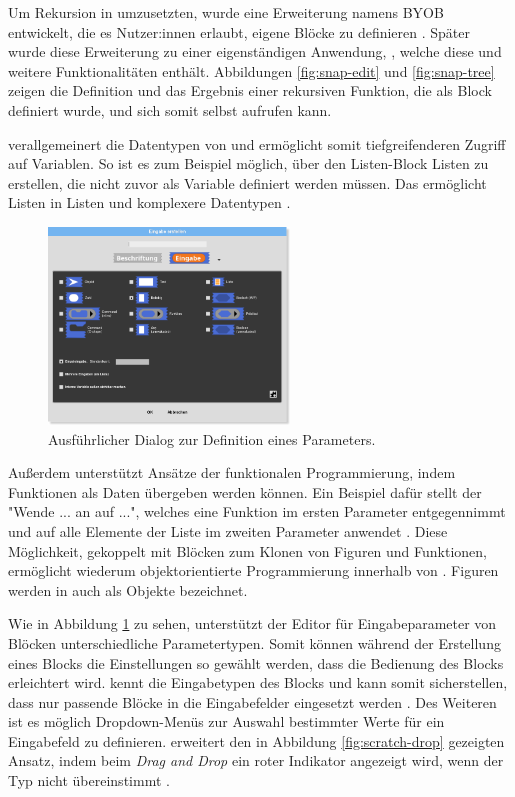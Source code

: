 Um Rekursion in \Scratch{} umzusetzten, wurde eine Erweiterung namens \ac{BYOB} entwickelt, die es Nutzer:innen erlaubt, eigene Blöcke zu definieren \parencite{harveyBringingNo2010}. Später wurde diese Erweiterung zu einer eigenständigen Anwendung, \Snap{}, welche diese und weitere Funktionalitäten enthält. Abbildungen \ref{fig:snap-edit} und \ref{fig:snap-tree} zeigen die Definition und das Ergebnis einer rekursiven Funktion, die als Block definiert wurde, und sich somit selbst aufrufen kann.

\Snap{} verallgemeinert die Datentypen von \Scratch{} und ermöglicht somit tiefgreifenderen Zugriff auf Variablen. So ist es zum Beispiel möglich, über den Listen-Block Listen zu erstellen, die nicht zuvor als Variable definiert werden müssen. Das ermöglicht Listen in Listen und komplexere Datentypen \parencite{harveySnapReference2020}.

\begin{figure}
  \centering
  \includegraphics[width=0.57\textwidth]{assets/snap-input-types.png}
  \caption{Ausführlicher Dialog zur Definition eines Parameters.}
  \label{fig:snap-input-types}
\end{figure}

Außerdem unterstützt \Snap{} Ansätze der funktionalen Programmierung, indem Funktionen als Daten übergeben werden können. Ein Beispiel dafür stellt der "Wende ... an auf ...", welches eine Funktion im ersten Parameter entgegennimmt und auf alle Elemente der Liste im zweiten Parameter anwendet \parencite{harveySnapReference2020}. Diese Möglichkeit, gekoppelt mit Blöcken zum Klonen von Figuren und Funktionen, ermöglicht wiederum objektorientierte Programmierung innerhalb von \Snap{} \parencite{harveySnapReference2020}. Figuren werden in \Snap{} auch als Objekte bezeichnet.

Wie in Abbildung \ref{fig:snap-input-types} zu sehen, unterstützt der Editor für Eingabeparameter von Blöcken unterschiedliche Parametertypen. Somit können während der Erstellung eines Blocks die Einstellungen so gewählt werden, dass die Bedienung des Blocks erleichtert wird. \Snap{} kennt die Eingabetypen des Blocks und kann somit sicherstellen, dass nur passende Blöcke in die Eingabefelder eingesetzt werden \parencite{harveySnapReference2020}. Des Weiteren ist es möglich Dropdown-Menüs zur Auswahl bestimmter Werte für ein Eingabefeld zu definieren. \Snap{} erweitert den in Abbildung \ref{fig:scratch-drop} gezeigten Ansatz, indem beim \textit{Drag and Drop} ein roter Indikator angezeigt wird, wenn der Typ nicht übereinstimmt \parencite{harveySnapReference2020}.

